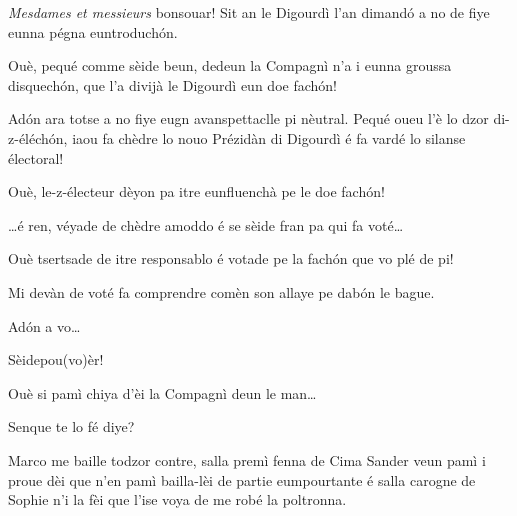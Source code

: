 \begin{drama}

\Aimespeaks \textit{Mesdames et messieurs} bonsouar! Sit an le Digourdì l’an dimand\'o a no de fiye eunna pégna euntroduch\'on.

\Juliespeaks Ouè, pequé comme sèide beun, dedeun la Compagnì n’a i eunna groussa disquech\'on, que l'a divijà le Digourdì eun doe fach\'on!

\Aimespeaks Ad\'on ara totse a no fiye eugn avanspettaclle pi nèutral.  Pequé oueu l’è lo dzor di-z-éléch\'on, iaou fa chèdre lo nouo Prézidàn di Digourdì é fa vardé lo silanse électoral!

\Juliespeaks Ouè, le-z-électeur dèyon pa itre eunfluenchà pe le doe fach\'on! 


\Aimespeaks {} \ldots é ren, véyade de chèdre amoddo é se sèide fran pa qui fa voté\ldots 


\Juliespeaks Ouè tsertsade de itre responsablo é votade pe la fach\'on  que vo plé de pi!

\Aimespeaks Mi devàn de voté fa comprendre comèn son allaye pe dab\'on le bague.

\Juliespeaks Ad\'on a vo\ldots

\Tcheuttedouspeaks Sèidepou(vo)èr!

\act[Acte I]

\ridoiver





\Presidanspeaks {}
Ouè si pamì chiya d'èi la Compagnì
deun le man\ldots

\Secreteospeaks Senque te lo fé diye?

\Presidanspeaks Marco me baille todzor contre, salla premì fenna de Cima Sander veun pamì i proue dèi que n’en pamì bailla-lèi de partie eumpourtante é salla carogne de Sophie n'i la fèi que l'ise voya de me robé la poltronna.


\end{drama}
